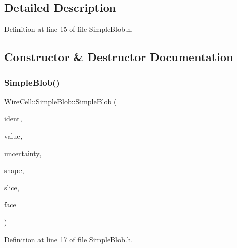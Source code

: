 \subsection{Detailed Description}


Definition at line 15 of file Simple\+Blob.\+h.



\subsection{Constructor \& Destructor Documentation}
\mbox{\label{class_wire_cell_1_1_simple_blob_a951bdf9fb09de509bd88a366fa657b69}} 
\subsubsection{\texorpdfstring{Simple\+Blob()}{SimpleBlob()}}
{\footnotesize\ttfamily Wire\+Cell\+::\+Simple\+Blob\+::\+Simple\+Blob (\begin{DoxyParamCaption}\item[{int}]{ident,  }\item[{float}]{value,  }\item[{float}]{uncertainty,  }\item[{const \hyperlink{class_wire_cell_1_1_ray_grid_1_1_blob}{Ray\+Grid\+::\+Blob} \&}]{shape,  }\item[{\hyperlink{class_wire_cell_1_1_i_data_aff870b3ae8333cf9265941eef62498bc}{I\+Slice\+::pointer}}]{slice,  }\item[{\hyperlink{class_wire_cell_1_1_interface_a09c548fb8266cfa39afb2e74a4615c37}{I\+Anode\+Face\+::pointer}}]{face }\end{DoxyParamCaption})\hspace{0.3cm}{\ttfamily [inline]}}



Definition at line 17 of file Simple\+Blob.\+h.

